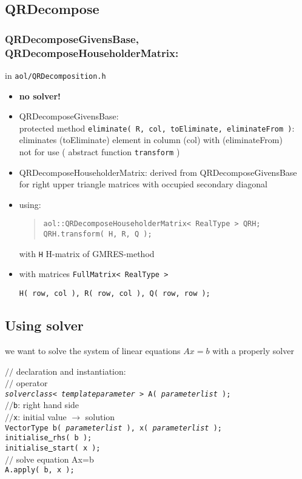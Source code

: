 
\subsection { QRDecompose}
\subsubsection{ QRDecomposeGivensBase, QRDecomposeHouseholderMatrix: } in \texttt{aol/QRDecomposition.h}
\begin{itemize}
\item \textbf{no solver!}
\item QRDecomposeGivensBase: \\
protected method \texttt{eliminate( R, col, toEliminate, eliminateFrom )}:\\
eliminates (toEliminate) element in column (col) with (eliminateFrom) \\
not for use ( abstract function \texttt{transform} )
\item QRDecomposeHouseholderMatrix: derived from QRDecomposeGivensBase\\
for right upper triangle matrices with occupied secondary diagonal
\item using: \begin{quote}
\texttt{aol::QRDecomposeHouseholderMatrix< RealType > QRH; \\
QRH.transform( H, R, Q );} \end{quote}
with \texttt{H} H-matrix of GMRES-method
\item with matrices \texttt{FullMatrix< RealType > }
\begin{flushright} \texttt{H( row, col ), R( row, col ), Q( row, row ); } \end{flushright}
\end{itemize}



\subsection {Using solver}
we want to solve the system of linear equations $Ax = b$ with a properly solver

$//$ declaration and instantiation:\\
$//$ operator\\
\texttt{{\em solverclass}< {\em templateparameter} > A( {\em parameterlist} ); }\\[2ex]
$//$\texttt{b}: right hand side \\
$//$\texttt{x}: initial value $\rightarrow$ solution \\
\texttt{VectorType b( {\em parameterlist} ), x( {\em parameterlist} ); \\
initialise\underline{ }rhs( b ); \\ initialise\underline{ }start( x );}\\[2ex]
$//$ solve equation Ax=b\\
\texttt{A.apply( b, x );}

